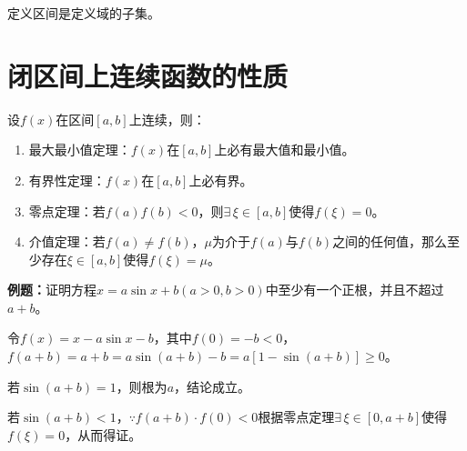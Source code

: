 \documentclass[UTF8, 12pt]{ctexart}
\begin{document}
定义区间是定义域的子集。

\section{闭区间上连续函数的性质}

设$f(x)$在区间$[a,b]$上连续，则：

\begin{enumerate}
    \item 最大最小值定理：$f(x)$在$[a,b]$上必有最大值和最小值。
    \item 有界性定理：$f(x)$在$[a,b]$上必有界。
    \item 零点定理：若$f(a)f(b)<0$，则$\exists\,\xi\in[a,b]$使得$f(\xi)=0$。
    \item 介值定理：若$f(a)\neq f(b)$，$\mu$为介于$f(a)$与$f(b)$之间的任何值，那么至少存在$\xi\in[a,b]$使得$f(\xi)=\mu$。
\end{enumerate}

\textbf{例题：}证明方程$x=a\sin x+b(a>0,b>0)$中至少有一个正根，并且不超过$a+b$。

令$f(x)=x-a\sin x-b$，其中$f(0)=-b<0$，$f(a+b)=a+b=a\sin(a+b)-b=a[1-\sin(a+b)]\geqslant 0$。

若$\sin(a+b)=1$，则根为$a$，结论成立。

若$\sin(a+b)<1$，$\because f(a+b)\cdot f(0)<0$根据零点定理$\exists\,\xi\in[0,a+b]$使得$f(\xi)=0$，从而得证。
\end{document}
